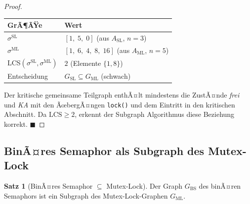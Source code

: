 ﻿\documentclass[a4paper,12pt]{article}
\theoremstyle{definition}
\newtheorem{satz}{Satz}
\begin{document}
\begin{proof}
\medskip
\begin{center}
\begin{tabular}{ll}
  \toprule
  GrÃ¶ÃŸe & Wert \\
  \midrule
  $\sigma^{\mathrm{SL}}$ & $[1,\; 5,\; 0]$ (aus $A_{\mathrm{SL}}$, $n=3$) \\
  $\sigma^{\mathrm{ML}}$ & $[1,\; 6,\; 4,\; 8,\; 16]$ (aus $A_{\mathrm{ML}}$, $n=5$) \\
  LCS$(\sigma^{\mathrm{SL}}, \sigma^{\mathrm{ML}})$ & $2$ (Elemente $\{1, 8\}$) \\
  Entscheidung & $G_{\mathrm{SL}} \subseteq G_{\mathrm{ML}}$ (schwach) \\
  \bottomrule
\end{tabular}
\end{center}

\medskip
Der kritische gemeinsame Teilgraph enthÃ¤lt mindestens die ZustÃ¤nde
\emph{frei} und \emph{KA} mit den ÃœbergÃ¤ngen \texttt{lock()} und dem
Eintritt in den kritischen Abschnitt. Da $\mathrm{LCS} \geq 2$, erkennt der
Subgraph Algorithmus diese Beziehung korrekt.
\hfill$\blacksquare$
\end{proof}

\subsection{BinÃ¤res Semaphor als Subgraph des Mutex-Lock}

\begin{satz}[BinÃ¤res Semaphor $\subseteq$ Mutex-Lock]
  \label{satz:bs_ml}
  Der Graph $G_{\mathrm{BS}}$ des binÃ¤ren Semaphors ist ein Subgraph des
  Mutex-Lock-Graphen $G_{\mathrm{ML}}$.
\end{satz}
\end{document}
